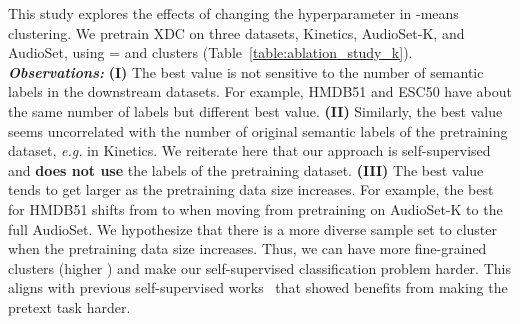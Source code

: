 \documentclass{article}
\begin{document}
This study explores the effects of changing the hyperparameter  in -means clustering. We pretrain XDC on three datasets, Kinetics, AudioSet-K, and AudioSet, using = and  clusters (Table~\ref{table:ablation_study_k}). 
\textbf{\textit{Observations:}}
\textbf{{(I)}} The best  value is not sensitive to the number of semantic labels in the downstream datasets. For example, HMDB51 and ESC50 have about the same number of labels but different best  value.
\textbf{{(II)}} Similarly, the best  value seems uncorrelated with the number of original semantic labels of the pretraining dataset, \emph{e.g.}  in Kinetics. We reiterate here that our approach is self-supervised and \textbf{does not use} the labels of the pretraining dataset.
\textbf{{(III)}} The best  value tends to get larger as the pretraining data size increases. For example, the best  for HMDB51 shifts from  to  when moving from pretraining on AudioSet-K to the full AudioSet. We hypothesize that there is a more diverse sample set to cluster when the pretraining data size increases. Thus, we can have more fine-grained clusters (higher ) and make our self-supervised classification problem harder. This aligns with previous self-supervised works~\cite{goyal2019scaling,avts} that showed benefits from making the pretext task harder.
\end{document}
